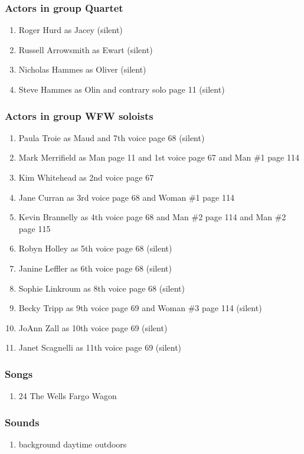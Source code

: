 \subsubsection{Actors in group Quartet}
\begin{enumerate}
\item Roger Hurd as Jacey (silent)
\item Russell Arrowsmith as Ewart (silent)
\item Nicholas Hammes as Oliver (silent)
\item Steve Hammes as Olin and contrary solo page 11 (silent)
\end{enumerate}
\subsubsection{Actors in group WFW soloists}
\begin{enumerate}
\item Paula Troie as Maud and 7th voice page 68 (silent)
\item Mark Merrifield as Man page 11 and 1st voice page 67 and Man \#1 page 114
\item Kim Whitehead as 2nd voice page 67
\item Jane Curran as 3rd voice page 68 and Woman \#1 page 114
\item Kevin Brannelly as 4th voice page 68 and Man \#2 page 114 and Man \#2 page 115
\item Robyn Holley as 5th voice page 68 (silent)
\item Janine Leffler as 6th voice page 68 (silent)
\item Sophie Linkroum as 8th voice page 68 (silent)
\item Becky Tripp as 9th voice page 69 and Woman \#3 page 114 (silent)
\item JoAnn Zall as 10th voice page 69 (silent)
\item Janet Scagnelli as 11th voice page 69 (silent)
\end{enumerate}

\subsubsection{Songs}
\begin{enumerate}
\item 24 The Wells Fargo Wagon
\end{enumerate}\subsubsection{Sounds}
\begin{enumerate}
\item background daytime outdoors
\end{enumerate}
